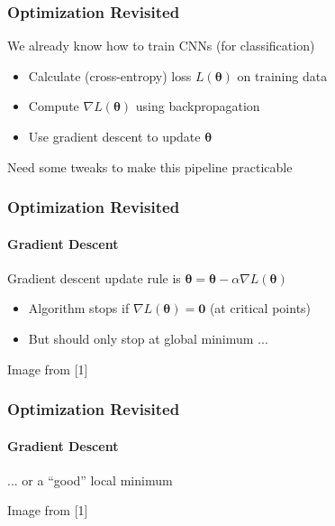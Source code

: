 \documentclass[xetex,professionalfont]{beamer}
\renewcommand\emph[1]{\textcolor{tuwcvl_cvl_blue}{#1}}
\renewcommand{\vec}[1]{\ensuremath{\mathbf{#1}}}
\newcommand{\bth}{\boldsymbol{\theta}}
\begin{document}
\begin{frame}
\frametitle{Optimization Revisited}

We already know how to train CNNs (for classification)
\begin{itemize}
    \item Calculate (cross-entropy) loss $L(\bth)$ on training data
    \item Compute $\nabla L(\bth)$ using backpropagation
    \item Use gradient descent to update $\bth$
\end{itemize}

\bigskip

Need some tweaks to make this pipeline practicable

\end{frame}


\begin{frame}
\frametitle{Optimization Revisited}
\framesubtitle{Gradient Descent}

Gradient descent update rule is $\bth=\bth-\alpha\nabla L(\bth)$
\begin{itemize}
    \item Algorithm stops if $\nabla L(\bth)=\vec{0}$ (at \emph{critical points}) %
    \item But should only stop at global minimum ...
\end{itemize}

\medskip

\begin{center}
{\centering Image from [1]}
\end{center}

\end{frame}


\begin{frame}
\frametitle{Optimization Revisited}
\framesubtitle{Gradient Descent}

... or a \enquote{good} local minimum

\medskip

\begin{center}
{\centering Image from [1]}
\end{center}

\end{frame}
\end{document}
